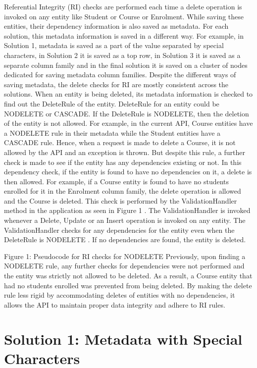 \begin{description}
Referential Integrity (RI) checks are performed each time a delete
operation is invoked on any entity like Student or Course or Enrolment. While
saving these entities, their dependency information is also saved as metadata.
For each solution, this metadata information is saved in a different way. For
example, in Solution 1, metadata is saved as a part of the value separated by
special characters, in Solution 2 it is saved as a top row, in Solution 3 it is
saved as a separate column family and in the final solution it is saved on a
cluster of nodes dedicated for saving metadata column families. Despite the
different ways of saving metadata, the delete checks for RI are mostly
consistent across the solutions.
When an entity is being deleted, its metadata information is checked to find out
the DeleteRule of the entity. DeleteRule for an entity could be NODELETE or
CASCADE. If the DeleteRule is NODELETE, then the deletion of the entity is not
allowed. For example, in the current API, Course entities have a NODELETE rule
in their metadata while the Student entities have a CASCADE rule. Hence, when a
request is made to delete a Course, it is not allowed by the API and an
exception is thrown. But despite this rule, a further check is made to see if
the entity has any dependencies existing or not. In this dependency check, if
the entity is found to have no dependencies on it, a delete is then allowed. 
For example, if a Course entity is found to have no students enrolled for it in
the Enrolment column family, the delete operation is allowed and the Course is
deleted.
This check is performed by the ValidationHandler method in the application as
seen in Figure 1 . The ValidationHandler is invoked whenever a Delete, Update or
an Insert operation is invoked on any entity. The ValidationHandler checks for
any dependencies for the entity even when the DeleteRule  is NODELETE . If no
dependencies are found, the entity is deleted.
 
Figure 1: Pseudocode for RI checks for NODELETE Previously, upon finding a
NODELETE rule, any further checks for dependencies were not performed and the
entity was strictly not allowed to be deleted. As a result, a Course entity that
had no students enrolled was prevented from being deleted.
By making the delete rule less rigid by accommodating deletes of entities with
no dependencies, it allows the API to maintain proper data integrity and adhere
to RI rules.

\end{description}

\section{Solution 1:  Metadata with Special Characters}\label{s:sol1}

